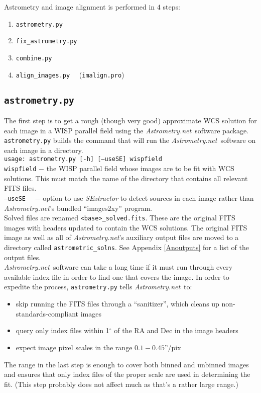 \documentclass{article}
\newlength{\wideitemsep}
\let\olditem\item
\renewcommand{\item}{\setlength{\itemsep}{\wideitemsep}\olditem}
\newcommand{\An}{\textit{Astrometry.net}}
\begin{document}
\noindent Astrometry and image alignment is performed in $4$ steps:
\begin{enumerate}
\item \texttt{astrometry.py}
\item \texttt{fix\_astrometry.py}
\item \texttt{combine.py}
\item \texttt{align\_images.py} ~~(\texttt{imalign.pro})
\end{enumerate}
\subsection{\texttt{astrometry.py}}
The first step is to get a rough (though very good) approximate WCS 
solution for each image in a WISP parallel field using the \An~software 
package. \texttt{astrometry.py} builds the command that will
run the \An~software on each image in a directory. \\

\texttt{usage: astrometry.py [-h] [--useSE] wispfield} \\

\texttt{wispfield} $-$ \hangindent=2.7cm the WISP parallel field whose images
are to be fit with WCS solutions. This must match the name of the directory that
contains all relevant FITS files.\\

\texttt{--useSE} ~~$-$ \hangindent=2.7cm option to use \textit{SExtractor} 
to detect sources in each image rather than \An's bundled ``images2xy'' 
program. \\

\noindent Solved files are renamed \texttt{<base>\_solved.fits}. These 
are the original FITS images with headers updated to contain the WCS
solutions. 
The original FITS image as well as all of \An's auxiliary
output files are moved to a directory called \texttt{astrometric\_solns}.
See Appendix \ref{Anoutputs} for a list of the output files. \\

\noindent \An~software can take a long time if it must run 
through every available index file in order to find one that covers the
image. In order to expedite the process, \texttt{astrometry.py} tells \An~to:
\begin{itemize}
    \item skip running the FITS files through a ``sanitizer'', which cleans up
    non-standards-compliant images
    \item query only index files within 1$^{\circ}$ of the RA and Dec in the 
    image headers
    \item expect image pixel scales in the range $0.1 - 0.45$''/pix 
\end{itemize}
The range in the last step is enough to cover both binned and unbinned images
and ensures that only index files of the proper scale are used in 
determining the fit. (This step probably does not affect much as
that's a rather large range.) \\
\end{document}
